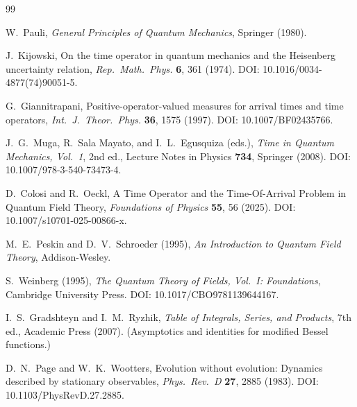 \documentclass[11pt, a4paper]{article}
\theoremstyle{definition}
\theoremstyle{plain}
\theoremstyle{remark}
\numberwithin{equation}{section}
\begin{document}
        \begin{thebibliography}{99}
            
            W.~Pauli,
            \textit{General Principles of Quantum Mechanics},
            Springer (1980).
            
            J.~Kijowski,
            On the time operator in quantum mechanics and the Heisenberg uncertainty relation,
            \textit{Rep.\ Math.\ Phys.} \textbf{6}, 361 (1974).
            DOI: 10.1016/0034-4877(74)90051-5.
            
            G.~Giannitrapani,
            Positive-operator-valued measures for arrival times and time operators,
            \textit{Int.\ J.\ Theor.\ Phys.} \textbf{36}, 1575 (1997).
            DOI: 10.1007/BF02435766.
            
            J.~G.~Muga, R.~Sala Mayato, and I.~L.~Egusquiza (eds.),
            \textit{Time in Quantum Mechanics, Vol.~1},
            2nd ed., Lecture Notes in Physics \textbf{734},
            Springer (2008).
            DOI: 10.1007/978-3-540-73473-4.
            
            D.~Colosi and R.~Oeckl,
            A Time Operator and the Time-Of-Arrival Problem in Quantum Field Theory,
            \textit{Foundations of Physics} \textbf{55}, 56 (2025).
            DOI: 10.1007/s10701-025-00866-x.
            
            M.~E.~Peskin and D.~V.~Schroeder (1995),
            \textit{An Introduction to Quantum Field Theory},
            Addison-Wesley.
            
            S.~Weinberg (1995),
            \textit{The Quantum Theory of Fields, Vol.\ I: Foundations},
            Cambridge University Press.
            DOI: 10.1017/CBO9781139644167.
            
            I.~S.~Gradshteyn and I.~M.~Ryzhik,
            \textit{Table of Integrals, Series, and Products},
            7th ed., Academic Press (2007).
            (Asymptotics and identities for modified Bessel functions.)
            
            D.~N.~Page and W.~K.~Wootters,
            Evolution without evolution: Dynamics described by stationary observables,
            \textit{Phys.\ Rev.\ D} \textbf{27}, 2885 (1983).
            DOI: 10.1103/PhysRevD.27.2885.
            

\end{thebibliography}
\end{document}
